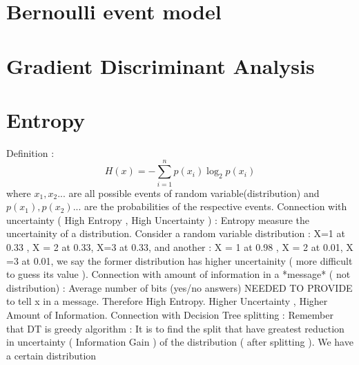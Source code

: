 \documentclass{article}
\begin{document}
\section{Bernoulli event model} 
\section{Gradient Discriminant Analysis} 
\section{Entropy} 
Definition : 
\[H(x) = -\sum_{i=1}^{n} p(x_i) \log_2 p(x_i)\] 
where \(x_1, x_2...\) are all possible events of random variable(distribution) and   \(p(x_1), p(x_2)...\) are the probabilities of the respective events.
\newline
\newline
Connection with uncertainty ( High Entropy , High Uncertainty ) :
\newline
\newline
Entropy measure the uncertainity of a distribution. Consider a random variable distribution :  X=1 at 0.33 , X = 2 at 0.33, X=3 at 0.33, and another : X = 1  at 0.98 , X = 2 at 0.01, X =3 at 0.01, we say the former distribution has higher uncertainity ( more difficult to guess its value ). 
\newline
\newline
Connection with amount of information in a *message* ( not distribution) :
\newline
\newline
Average number of bits (yes/no answers) NEEDED TO PROVIDE to tell x in a message. Therefore High Entropy. Higher Uncertainty , Higher Amount of Information. 
\newline
\newline
Connection with Decision Tree splitting : 
\newline
\newline
Remember that DT is greedy algorithm : It is to find the split that have greatest reduction in uncertainty ( Information Gain ) of the distribution ( after splitting ). We have a certain distribution 
\end{document}
